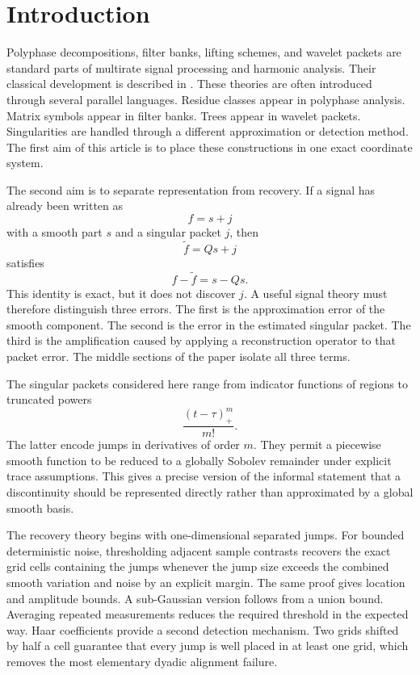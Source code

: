 \documentclass[11pt,letterpaper]{article}
\theoremstyle{plain}
\theoremstyle{plain}
\theoremstyle{plain}
\theoremstyle{definition}
\theoremstyle{definition}
\theoremstyle{definition}
\theoremstyle{definition}
\theoremstyle{remark}
\theoremstyle{remark}
\theoremstyle{remark}
\theoremstyle{remark}
\begin{document}
\section{Introduction}\label{extension:section:01}\label{sec:introduction}

Polyphase decompositions, filter banks, lifting schemes, and wavelet packets are standard parts of multirate signal processing and harmonic analysis. Their classical development is described in \cite{CrochiereRabiner1983,Vaidyanathan1993,VetterliKovacevic1995,StrangNguyen1996,Daubechies1992,Mallat2009}. These theories are often introduced through several parallel languages. Residue classes appear in polyphase analysis. Matrix symbols appear in filter banks. Trees appear in wavelet packets. Singularities are handled through a different approximation or detection method. The first aim of this article is to place these constructions in one exact coordinate system.

The second aim is to separate representation from recovery. If a signal has already been written as
\[
f=s+j
\]
with a smooth part \(s\) and a singular packet \(j\), then
\[
\widetilde f=Qs+j
\]
satisfies
\[
f-\widetilde f=s-Qs.
\]
This identity is exact, but it does not discover \(j\). A useful signal theory must therefore distinguish three errors. The first is the approximation error of the smooth component. The second is the error in the estimated singular packet. The third is the amplification caused by applying a reconstruction operator to that packet error. The middle sections of the paper isolate all three terms.

The singular packets considered here range from indicator functions of regions to truncated powers
\[
\frac{(t-\tau)_+^m}{m!}.
\]
The latter encode jumps in derivatives of order \(m\). They permit a piecewise smooth function to be reduced to a globally Sobolev remainder under explicit trace assumptions. This gives a precise version of the informal statement that a discontinuity should be represented directly rather than approximated by a global smooth basis.

The recovery theory begins with one-dimensional separated jumps. For bounded deterministic noise, thresholding adjacent sample contrasts recovers the exact grid cells containing the jumps whenever the jump size exceeds the combined smooth variation and noise by an explicit margin. The same proof gives location and amplitude bounds. A sub-Gaussian version follows from a union bound. Averaging repeated measurements reduces the required threshold in the expected way. Haar coefficients provide a second detection mechanism. Two grids shifted by half a cell guarantee that every jump is well placed in at least one grid, which removes the most elementary dyadic alignment failure.
\end{document}
